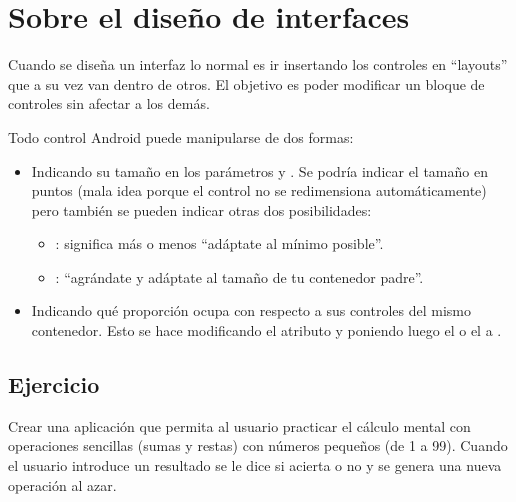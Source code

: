 \documentclass[a4paper,12pt,spanish]{sphinxmanual}
\begin{document}
\section{Sobre el diseño de interfaces}
\label{tema2:sobre-el-diseno-de-interfaces}
Cuando se diseña un interfaz lo normal es ir insertando los controles en ``layouts'' que a su vez van dentro de otros. El objetivo es poder modificar un bloque de controles sin afectar a los demás.

Todo control Android puede manipularse de dos formas:
\begin{itemize}
\item {} 
Indicando su tamaño en los parámetros  y . Se podría indicar el tamaño en puntos (mala idea porque el control no se redimensiona automáticamente) pero también se pueden indicar otras dos posibilidades:
\begin{itemize}
\item {} 
: significa más o menos ``adáptate al mínimo posible''.

\item {} 
: ``agrándate y adáptate al tamaño de tu contenedor padre''.

\end{itemize}

\item {} 
Indicando qué proporción ocupa con respecto a sus controles del mismo contenedor. Esto se hace modificando el atributo  y poniendo luego el  o el  a .

\end{itemize}


\subsection{Ejercicio}
\label{tema2:id1}
Crear una aplicación que permita al usuario practicar el cálculo mental con operaciones sencillas (sumas y restas) con números pequeños (de 1 a 99). Cuando el usuario introduce un resultado se le dice si acierta o no y se genera una nueva operación al azar.
\end{document}
